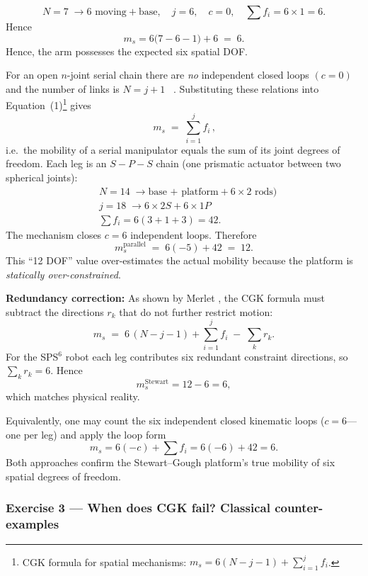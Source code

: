 \documentclass[12pt,a4paper]{article}
\begin{document}
\[
N = 7 \; \rightarrow{6\text{ moving} + \text{base}} , \quad
j = 6, \quad
c = 0,\quad
\sum f_i = 6\times 1 = 6 .
\]
Hence
\[
m_s
      = 6\bigl(7-6-1\bigr) + 6 \;=\; 6 .
\]
Hence, the arm possesses the expected six spatial DOF.

For an open \(n\)-joint serial chain there are \emph{no} independent
closed loops \((c = 0)\) and the number of links is \(N = j + 1\) ~\cite{Craig2005}.
Substituting these relations into Equation~(1)\footnote{%
CGK formula for spatial mechanisms:
\(m_s = 6(N-j-1) + \sum_{i=1}^{j} f_i\).} gives
\[
\boxed{\,m_s \;=\;
        \sum_{i=1}^{j} f_i\,},
\]
i.e.\ the mobility of a serial manipulator equals the sum of its joint
degrees of freedom.
Each leg is an \(S\!-\!P\!-\!S\) chain (one prismatic actuator between two
spherical joints):
\begin{align*}
&N = 14\;  \rightarrow{\text{base + platform} + 6\times 2\text{ rods})} \\
&j = 18\; \rightarrow{6\times 2S + 6\times 1P} \\
&\sum f_i = 6(3+1+3) = 42 .
\end{align*}
The mechanism closes \(c=6\) independent loops.  Therefore
\[
m_s^{\text{parallel}} \;=\; 6(-5) + 42 \;=\; 12 .
\]
This “12 DOF” value over-estimates the actual mobility because the
platform is \textit{statically over-constrained}.

\textbf{Redundancy correction:}
As shown by Merlet \cite[Sec.~2.2]{Merlet2006},
the CGK formula must subtract the directions \(r_k\) that
do not further restrict motion:
\begin{equation}
m_s \;=\; 6\,(N - j - 1) + \sum_{i=1}^{j} f_i
          \;-\; \sum_{k} r_k .
\end{equation}
For the SPS\(^6\) robot each leg contributes six redundant
constraint directions, so \(\sum_k r_k = 6\).
Hence
\[
m_s^{\text{Stewart}}
  = 12 - 6
  = 6 ,
\]
which matches physical reality.

Equivalently, one may count the six independent closed kinematic loops
($c=6$—one per leg) and apply the loop form
\[
m_s = 6(-c) + \sum f_i = 6(-6) + 42 = 6 .
\]
Both approaches confirm the Stewart–Gough platform’s true mobility of
six spatial degrees of freedom.

\subsubsection*{Exercise 3 — When does CGK fail?  Classical counter-examples}
\end{document}
